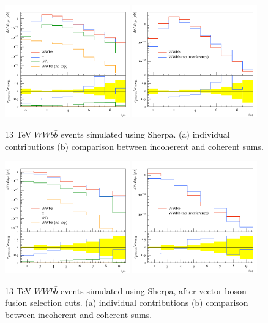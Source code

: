 \documentclass[11pt]{cernrep}
\begin{document}
\begin{figure}
\centering
	\includegraphics[width=0.48\textwidth]{WBF_njets_before_contribs.pdf}
	\includegraphics[width=0.48\textwidth]{WBF_njets_before.pdf}
\caption{\label{fig:wbf_before}
  13 TeV $WWb\bar{b}$ events simulated using Sherpa.
  (a) individual contributions (b) comparison between incoherent and coherent sums.}
\end{figure}

\begin{figure}
\centering
	\includegraphics[width=0.48\textwidth]{WBF_njets_after_contribs.pdf}
	\includegraphics[width=0.48\textwidth]{WBF_njets_after.pdf}
\caption{\label{fig:wbf_after}
  13 TeV $WWb\bar{b}$ events simulated using Sherpa, after vector-boson-fusion selection cuts. 
  (a) individual contributions (b) comparison between incoherent and coherent sums.}
\end{figure}
\end{document}
